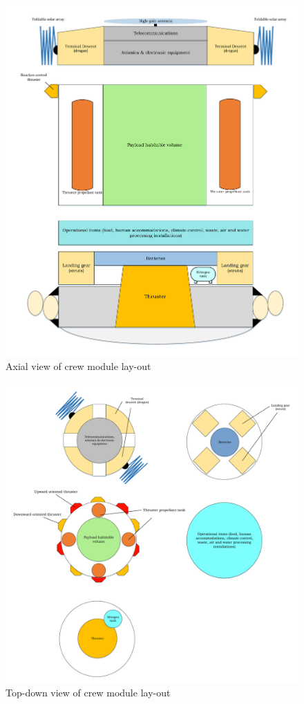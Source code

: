 \begin{figure}[h]
		\centering
		\includegraphics[width=1.0\textwidth]{./Figure/CrewModule/Axialview.pdf}
		\caption{Axial view of crew module lay-out}
		\label{fig:axview}
\end{figure}

\begin{figure}[h]
		\centering
		\includegraphics[width=1.0\textwidth]{./Figure/CrewModule/TopviewV2.pdf}
		\caption{Top-down view of crew module lay-out}
		\label{fig:topview}
\end{figure}


